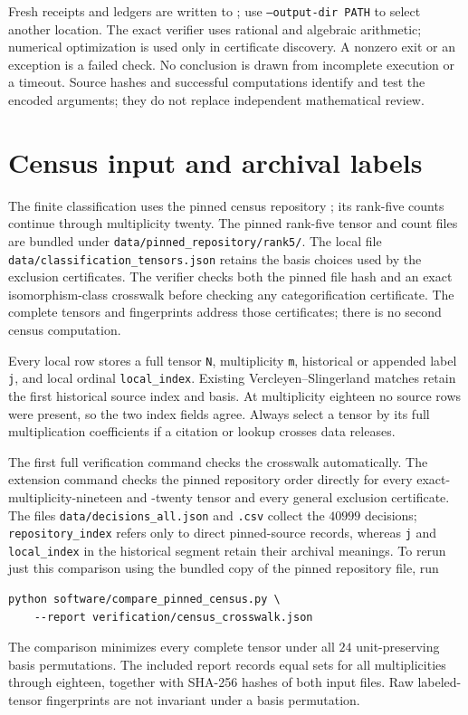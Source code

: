 \documentclass[11pt]{article}
\begin{document}
Fresh receipts and ledgers are written to ; use
\texttt{--output-dir PATH} to select another location. The exact verifier
uses rational and algebraic arithmetic; numerical optimization is used only
in certificate discovery. A nonzero exit or an exception is a failed check.
No conclusion is drawn from incomplete execution or a timeout. Source hashes
and successful computations identify and test the encoded arguments; they do
not replace independent mathematical review.

\section{Census input and archival labels}
The finite classification uses the pinned census repository
\cite{Census}; its rank-five counts continue through multiplicity twenty.
The pinned rank-five tensor and count files are bundled under
\texttt{data/pinned\_repository/rank5/}. The local file
\texttt{data/classification\_tensors.json} retains the basis choices
used by the exclusion certificates. The verifier checks both the pinned
file hash and an exact isomorphism-class crosswalk before checking any
categorification certificate. The complete tensors and fingerprints
address those certificates; there is no second census computation.

Every local row stores a full tensor \texttt{N}, multiplicity \texttt{m},
historical or appended label \texttt{j}, and local ordinal
\texttt{local\_index}. Existing Vercleyen--Slingerland matches
retain the first historical source index and basis. At multiplicity
eighteen no source rows were present, so the two index fields agree.
Always select a tensor by its full multiplication coefficients if a
citation or lookup crosses data releases.

The first full verification command checks the crosswalk automatically.
The extension command checks the pinned repository order directly for
every exact-multiplicity-nineteen and -twenty tensor and every general
exclusion certificate. The files \texttt{data/decisions\_all.json} and
\texttt{.csv} collect the $40999$ decisions; \texttt{repository\_index}
refers only to direct pinned-source records, whereas \texttt{j} and
\texttt{local\_index} in the historical segment retain their
archival meanings.
To rerun just this comparison using the bundled copy of the pinned
repository file, run
\begin{verbatim}
python software/compare_pinned_census.py \
    --report verification/census_crosswalk.json
\end{verbatim}
The comparison minimizes every complete tensor under all $24$
unit-preserving basis permutations. The included report records equal
sets for all multiplicities through eighteen, together with SHA-256
hashes of both input files. Raw labeled-tensor fingerprints are not
invariant under a basis permutation.
\end{document}
